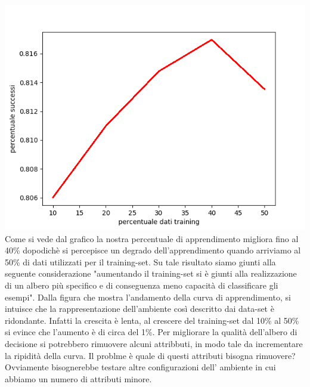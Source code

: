 		\includegraphics[scale=0.86]{performance.png}
		Come si vede dal grafico la nostra percentuale di apprendimento migliora fino al 40\% dopodichè si percepisce un degrado dell'apprendimento quando arriviamo al 50\% di dati utilizzati per il training-set.
		\newline
		 Su tale risultato siamo giunti alla seguente considerazione "aumentando il training-set si è giunti alla realizzazione di un albero più specifico e di conseguenza meno capacità di classificare gli esempi".
		 Dalla figura che mostra l'andamento della curva di apprendimento, si intuisce che la rappresentazione dell'ambiente così descritto dai data-set è ridondante.
		  Infatti la crescita è lenta, al crescere del training-set dal 10\% al 50\% si evince che l'aumento è di circa del 1\%.
		  Per migliorare la qualità dell'albero di decisione si potrebbero rimuovere alcuni attribbuti, in modo tale da incrementare la ripidità della curva.
		  Il problme è quale di questi attributi bisogna rimuovere?
		  \newline
			Ovviamente  bisognerebbe testare altre configurazioni dell' ambiente in cui abbiamo un numero di attributi minore.
		\subsection{}
		
